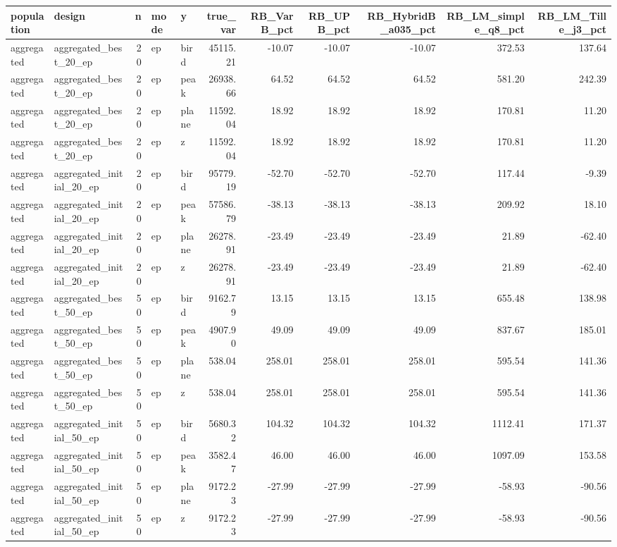 \begin{tabular}{llrllrrrrrr}
\toprule
population & design & n & mode & y & true_var & RB_VarB_pct & RB_UPB_pct & RB_HybridB_a035_pct & RB_LM_simple_q8_pct & RB_LM_Tille_j3_pct \\
\midrule
aggregated & aggregated_best_20_ep & 20 & ep & bird & 45115.21 & -10.07 & -10.07 & -10.07 & 372.53 & 137.64 \\
aggregated & aggregated_best_20_ep & 20 & ep & peak & 26938.66 & 64.52 & 64.52 & 64.52 & 581.20 & 242.39 \\
aggregated & aggregated_best_20_ep & 20 & ep & plane & 11592.04 & 18.92 & 18.92 & 18.92 & 170.81 & 11.20 \\
aggregated & aggregated_best_20_ep & 20 & ep & z & 11592.04 & 18.92 & 18.92 & 18.92 & 170.81 & 11.20 \\
aggregated & aggregated_initial_20_ep & 20 & ep & bird & 95779.19 & -52.70 & -52.70 & -52.70 & 117.44 & -9.39 \\
aggregated & aggregated_initial_20_ep & 20 & ep & peak & 57586.79 & -38.13 & -38.13 & -38.13 & 209.92 & 18.10 \\
aggregated & aggregated_initial_20_ep & 20 & ep & plane & 26278.91 & -23.49 & -23.49 & -23.49 & 21.89 & -62.40 \\
aggregated & aggregated_initial_20_ep & 20 & ep & z & 26278.91 & -23.49 & -23.49 & -23.49 & 21.89 & -62.40 \\
aggregated & aggregated_best_50_ep & 50 & ep & bird & 9162.79 & 13.15 & 13.15 & 13.15 & 655.48 & 138.98 \\
aggregated & aggregated_best_50_ep & 50 & ep & peak & 4907.90 & 49.09 & 49.09 & 49.09 & 837.67 & 185.01 \\
aggregated & aggregated_best_50_ep & 50 & ep & plane & 538.04 & 258.01 & 258.01 & 258.01 & 595.54 & 141.36 \\
aggregated & aggregated_best_50_ep & 50 & ep & z & 538.04 & 258.01 & 258.01 & 258.01 & 595.54 & 141.36 \\
aggregated & aggregated_initial_50_ep & 50 & ep & bird & 5680.32 & 104.32 & 104.32 & 104.32 & 1112.41 & 171.37 \\
aggregated & aggregated_initial_50_ep & 50 & ep & peak & 3582.47 & 46.00 & 46.00 & 46.00 & 1097.09 & 153.58 \\
aggregated & aggregated_initial_50_ep & 50 & ep & plane & 9172.23 & -27.99 & -27.99 & -27.99 & -58.93 & -90.56 \\
aggregated & aggregated_initial_50_ep & 50 & ep & z & 9172.23 & -27.99 & -27.99 & -27.99 & -58.93 & -90.56 \\

\end{tabular}
